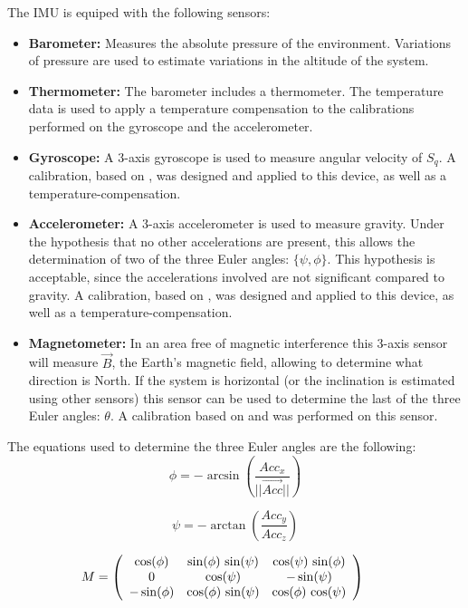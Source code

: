 \documentclass[conference]{IEEEtran}
\begin{document}
The IMU is equiped with the following sensors:
\begin{itemize}
\item \textbf{Barometer:} Measures the absolute pressure of the environment. Variations of pressure are used to estimate variations in the altitude of the system.
\item \textbf{Thermometer:} The barometer includes a thermometer. The temperature data is used to apply a temperature compensation to the calibrations performed on the gyroscope and the accelerometer.
\item \textbf{Gyroscope:} A 3-axis gyroscope is used to measure angular velocity of $S_q$. A calibration, based on \cite{bib:calib_imu}, was designed and applied to this device, as well as a temperature-compensation.
\item \textbf{Accelerometer:} A 3-axis accelerometer is used to measure gravity. Under the hypothesis that no other accelerations are present, this allows the determination of two of the three Euler angles: $\{\psi, \phi\}$. This hypothesis is acceptable, since the accelerations involved are not significant compared to gravity. A calibration, based on \cite{bib:calib_imu}, was designed and applied to this device, as well as a temperature-compensation.
\item \textbf{Magnetometer:} In an area free of magnetic interference this 3-axis sensor will measure $\vec{B}$, the Earth's magnetic field, allowing to determine what direction is North. If the system is horizontal (or the inclination is estimated using other sensors) this sensor can be used to determine the last of the three Euler angles: $\theta$. A calibration based on \cite{bib:bola} and \cite{bib:alain} was performed on this sensor.
\end{itemize}

The equations used to determine the three Euler angles are the following\cite{bib:kalman}:
  \[
  \phi = -\arcsin\left(\frac{Acc_x}{\vert\vert\vec{Acc}\vert\vert}\right)
  \]

  \[
  \psi =- \arctan \left(\frac{Acc_y}{Acc_z}\right)
  \]
      
  \[
  \hspace{-20pt}
  M = 
\left(\begin{array}{ccc} \cos\!\left(\mathrm{\phi}\right) & \sin\!\left(\mathrm{\phi}\right)\, \sin\!\left(\mathrm{\psi}\right) & \cos\!\left(\mathrm{\psi}\right)\, \sin\!\left(\mathrm{\phi}\right)\\ 0 & \cos\!\left(\mathrm{\psi}\right) & - \sin\!\left(\mathrm{\psi}\right)\\ - \sin\!\left(\mathrm{\phi}\right) & \cos\!\left(\mathrm{\phi}\right)\, \sin\!\left(\mathrm{\psi}\right) & \cos\!\left(\mathrm{\phi}\right)\, \cos\!\left(\mathrm{\psi}\right) \end{array}\right)
  \]
\end{document}
